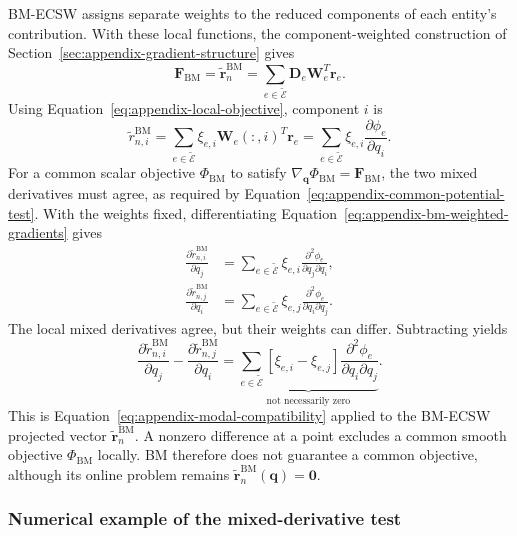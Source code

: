 \documentclass[a4paper,12pt]{article}
\newcommand{\vect}[1]{\boldsymbol{#1}}
\newcommand{\matr}[1]{\boldsymbol{#1}}
\begin{document}
BM-ECSW assigns separate weights to the reduced components of each entity's contribution. With these local functions, the component-weighted construction of Section~\ref{sec:appendix-gradient-structure} gives
\begin{equation}
 \vect{F}_{\mathrm{BM}}
 =\widetilde{\vect{r}}_n^{\mathrm{BM}}
 =\sum_{e\in\widetilde{\mathcal E}}\matr{D}_e\matr{W}_e^T\vect{r}_e.
 \label{eq:appendix-bm-projected-vector}
\end{equation}
Using Equation~\eqref{eq:appendix-local-objective}, component $i$ is
\begin{equation}
 \widetilde r_{n,i}^{\mathrm{BM}}
 =\sum_{e\in\widetilde{\mathcal E}}\xi_{e,i}
                       \matr{W}_e(:,i)^T\vect{r}_e
 =\sum_{e\in\widetilde{\mathcal E}}\xi_{e,i}
                         \frac{\partial\phi_e}{\partial q_i}.
 \label{eq:appendix-bm-weighted-gradients}
\end{equation}
For a common scalar objective $\Phi_{\mathrm{BM}}$ to satisfy $\nabla_{\vect{q}}\Phi_{\mathrm{BM}}=\vect{F}_{\mathrm{BM}}$, the two mixed derivatives must agree, as required by Equation~\eqref{eq:appendix-common-potential-test}. With the weights fixed, differentiating Equation~\eqref{eq:appendix-bm-weighted-gradients} gives
\[
 \begin{aligned}
 \frac{\partial\widetilde r_{n,i}^{\mathrm{BM}}}{\partial q_j}
 &=\sum_{e\in\widetilde{\mathcal E}}\xi_{e,i}
       \frac{\partial^2\phi_e}{\partial q_j\partial q_i},\\
 \frac{\partial\widetilde r_{n,j}^{\mathrm{BM}}}{\partial q_i}
 &=\sum_{e\in\widetilde{\mathcal E}}\xi_{e,j}
       \frac{\partial^2\phi_e}{\partial q_i\partial q_j}.
 \end{aligned}
\]
The local mixed derivatives agree, but their weights can differ. Subtracting yields
\[
 \frac{\partial\widetilde r_{n,i}^{\mathrm{BM}}}{\partial q_j}
 -\frac{\partial\widetilde r_{n,j}^{\mathrm{BM}}}{\partial q_i}
 =\underbrace{
   \sum_{e\in\widetilde{\mathcal E}}[\xi_{e,i}-\xi_{e,j}]
       \frac{\partial^2\phi_e}{\partial q_i\partial q_j}
   }_{\text{not necessarily zero}}.
\]
This is Equation~\eqref{eq:appendix-modal-compatibility} applied to the BM-ECSW projected vector $\widetilde{\vect{r}}_n^{\mathrm{BM}}$. A nonzero difference at a point excludes a common smooth objective $\Phi_{\mathrm{BM}}$ locally. BM therefore does not guarantee a common objective, although its online problem remains $\widetilde{\vect{r}}_n^{\mathrm{BM}}(\vect{q})=\vect{0}$.

\subsubsection{Numerical example of the mixed-derivative test}
\label{sec:appendix-lspg-numerical-example}
\end{document}
